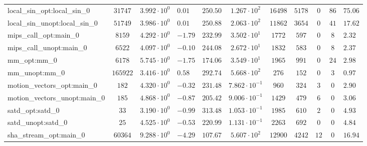 \begin{tabular}{|l|c|HHc|c|c|c|c|cH|}
local\_sin\_opt:local\_sin\_0                   & $ 31747    $ & $ 3.992 \cdot 10^{0} $ & $ 0.01  $ & $ 250.50 $ & $ 1.267 \cdot 10^{2}  $ & $ 16498  $ & $ 5178  $ & $ 0   $ & $ 86  $ & $ 75.06   $ \\
local\_sin\_unopt:local\_sin\_0                 & $ 51749    $ & $ 3.986 \cdot 10^{0} $ & $ 0.01  $ & $ 250.88 $ & $ 2.063 \cdot 10^{2}  $ & $ 11862  $ & $ 3654  $ & $ 0   $ & $ 41  $ & $ 17.62   $ \\
mips\_call\_opt:main\_0                         & $ 8159     $ & $ 4.292 \cdot 10^{0} $ & $ -1.79 $ & $ 232.99 $ & $ 3.502 \cdot 10^{1}  $ & $ 1772   $ & $ 597   $ & $ 0   $ & $ 8   $ & $ 2.32    $ \\
mips\_call\_unopt:main\_0                       & $ 6522     $ & $ 4.097 \cdot 10^{0} $ & $ -0.10 $ & $ 244.08 $ & $ 2.672 \cdot 10^{1}  $ & $ 1832   $ & $ 583   $ & $ 0   $ & $ 8   $ & $ 2.37    $ \\
mm\_opt:mm\_0                                   & $ 6178     $ & $ 5.745 \cdot 10^{0} $ & $ -1.75 $ & $ 174.06 $ & $ 3.549 \cdot 10^{1}  $ & $ 1965   $ & $ 991   $ & $ 0   $ & $ 24  $ & $ 2.98    $ \\
mm\_unopt:mm\_0                                 & $ 165922   $ & $ 3.416 \cdot 10^{0} $ & $ 0.58  $ & $ 292.74 $ & $ 5.668 \cdot 10^{2}  $ & $ 276    $ & $ 152   $ & $ 0   $ & $ 3   $ & $ 0.97    $ \\
motion\_vectors\_opt:main\_0                    & $ 182      $ & $ 4.320 \cdot 10^{0} $ & $ -0.32 $ & $ 231.48 $ & $ 7.862 \cdot 10^{-1} $ & $ 960    $ & $ 324   $ & $ 3   $ & $ 0   $ & $ 2.90    $ \\
motion\_vectors\_unopt:main\_0                  & $ 185      $ & $ 4.868 \cdot 10^{0} $ & $ -0.87 $ & $ 205.42 $ & $ 9.006 \cdot 10^{-1} $ & $ 1429   $ & $ 479   $ & $ 6   $ & $ 0   $ & $ 3.06    $ \\
satd\_opt:satd\_0                               & $ 33       $ & $ 3.190 \cdot 10^{0} $ & $ -0.99 $ & $ 313.48 $ & $ 1.053 \cdot 10^{-1} $ & $ 1985   $ & $ 610   $ & $ 2   $ & $ 0   $ & $ 4.93    $ \\
satd\_unopt:satd\_0                             & $ 25       $ & $ 4.525 \cdot 10^{0} $ & $ -0.53 $ & $ 220.99 $ & $ 1.131 \cdot 10^{-1} $ & $ 2263   $ & $ 692   $ & $ 0   $ & $ 0   $ & $ 4.84    $ \\
sha\_stream\_opt:main\_0                        & $ 60364    $ & $ 9.288 \cdot 10^{0} $ & $ -4.29 $ & $ 107.67 $ & $ 5.607 \cdot 10^{2}  $ & $ 12900  $ & $ 4242  $ & $ 12  $ & $ 0   $ & $ 16.94   $ \\

\end{tabular}
